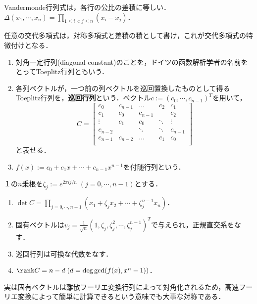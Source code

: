 \documentclass[uplatex, dvipdfmx]{jsreport}
\begin{document}
\begin{lemma}
    Vandermonde行列式は，各行の公比の差積に等しい．
    $\Delta(x_1,\cdots,x_n)=\prod_{1\le i<j\le n}(x_i-x_j)$．
\end{lemma}
\begin{remark}[差積について]
    任意の交代多項式は，対称多項式と差積の積として書け，これが交代多項式の特徴付けとなる．
\end{remark}

\begin{definition}\mbox{}
    \begin{enumerate}
        \item 対角一定行列(diagonal-constant)のことを，ドイツの函数解析学者の名前をとってToeplitz行列ともいう．
        \item 各列ベクトルが，一つ前の列ベクトルを巡回置換したものとして得るToeplitz行列を，\textbf{巡回行列}という．ベクトル$c:=(c_0,\cdots,c_{n-1})^T$を用いて，
        \[C=\begin{bmatrix}c_{0}&c_{n-1}&\dots &c_{2}&c_{1}\\c_{1}&c_{0}&c_{n-1}&&c_{2}\\\vdots &c_{1}&c_{0}&\ddots &\vdots \\c_{n-2}&&\ddots &\ddots &c_{n-1}\\c_{n-1}&c_{n-2}&\dots &c_{1}&c_{0}\\\end{bmatrix}\]
        と表せる．
        \item $f(x):=c_0+c_1x+\cdots+c_{n-1}x^{n-1}$を付随行列という．
    \end{enumerate}
\end{definition}

\begin{lemma}
    １の$n$乗根を$\zeta_j:=e^{2\pi ij/n}\;(j=0,\cdots,n-1)$とする．
    \begin{enumerate}
        \item $\det C=\prod_{j=0,\cdots,n-1}(x_1+\zeta_jx_2+\cdots+\zeta_j^{n-1}x_n)$．
        \item 固有ベクトルは$v_j=\frac{1}{\sqrt{n}}(1,\zeta_j,\zeta_j^2,\cdots,\zeta_j^{n-1})^T$で与えられ，正規直交系をなす．
        \item 巡回行列は可換な代数をなす．
        \item $\rank C=n-d\;(d=\deg\gcd(f(x),x^n-1))$．
    \end{enumerate}
\end{lemma}
\begin{remark}
    実は固有ベクトルは離散フーリエ変換行列によって対角化されるため，高速フーリエ変換によって簡単に計算できるという意味でも大事な対称である．
\end{remark}
\end{document}
